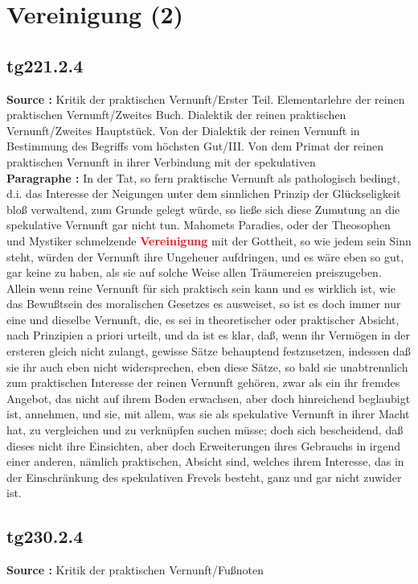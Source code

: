 \documentclass[a4paper,12pt,twoside]{book}
\newcommand{\match}[1]{\textcolor{red}{\textbf{#1}}}
\newcommand{\unnumberedsection}[1]{
	\section*{#1}
	\addcontentsline{toc}{section}{#1}
	\markright{#1}
}
\begin{document}
	\unnumberedsection{Vereinigung (2)} 
	\subsection*{tg221.2.4} 
	\textbf{Source : }Kritik der praktischen Vernunft/Erster Teil. Elementarlehre der reinen praktischen Vernunft/Zweites Buch. Dialektik der reinen praktischen Vernunft/Zweites Hauptstück. Von der Dialektik der reinen Vernunft in Bestimmung des Begriffs vom höchsten Gut/III. Von dem Primat der reinen praktischen Vernunft in ihrer Verbindung mit der spekulativen\\  
	
	\noindent\textbf{Paragraphe : }
	In der Tat, so fern praktische Vernunft als pathologisch bedingt, d.i. das Interesse der Neigungen unter dem sinnlichen Prinzip der Glückseligkeit bloß verwaltend, zum Grunde gelegt würde, so ließe sich diese Zumutung an die spekulative Vernunft gar nicht tun. Mahomets Paradies, oder der Theosophen und Mystiker schmelzende \match{Vereinigung} mit der Gottheit, so wie jedem sein Sinn steht, würden der Vernunft ihre Ungeheuer aufdringen, und es wäre eben so gut, gar keine zu haben, als sie auf solche Weise allen Träumereien preiszugeben. Allein wenn reine Vernunft für sich praktisch sein kann und es wirklich ist, wie das Bewußtsein des moralischen Gesetzes es ausweiset, so ist es doch immer nur eine und dieselbe Vernunft, die, es sei in theoretischer oder praktischer Absicht, nach Prinzipien a priori urteilt, und da ist es klar, daß, wenn ihr Vermögen in der ersteren gleich nicht zulangt, gewisse Sätze behauptend festzusetzen, indessen daß sie ihr auch eben nicht widersprechen, eben diese Sätze, so bald sie unabtrennlich zum praktischen Interesse der reinen Vernunft gehören, zwar als ein ihr fremdes Angebot, das nicht auf ihrem Boden erwachsen, aber doch hinreichend beglaubigt ist, annehmen, und sie, mit allem, was sie als spekulative Vernunft in ihrer Macht hat, zu vergleichen und zu verknüpfen suchen müsse; doch sich bescheidend, daß dieses nicht ihre Einsichten, aber doch Erweiterungen ihres Gebrauchs in irgend einer anderen, nämlich praktischen, Absicht sind, welches ihrem Interesse, das in der Einschränkung des spekulativen Frevels besteht, ganz und gar nicht zuwider ist. 
	
	\subsection*{tg230.2.4} 
	\textbf{Source : }Kritik der praktischen Vernunft/Fußnoten\\  
	
\end{document}
